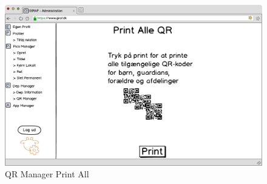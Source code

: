 \begin{figure}[!h]
\centering
\includegraphics[width=1\textwidth]{images/mockup/qrManagerPrintAll.png}
\caption{QR Manager Print All}
\label{fig:qr_manager_print_all}
\end{figure}